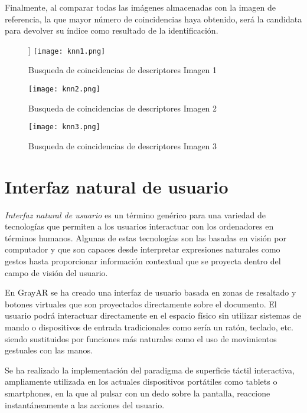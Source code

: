 Finalmente, al comparar todas las imágenes almacenadas con la imagen
de referencia, la que mayor número de coincidencias haya obtenido, será
la candidata para devolver su índice como resultado de la identificación.

  \begin{figure}] 
    \centering
    \texttt{[image: knn1.png]}
    \caption{Busqueda de coincidencias de descriptores Imagen 1}
    \label{fig:knn1}
  \end{figure}



  \begin{figure} 
    \centering
    \texttt{[image: knn2.png]}
    \caption{Busqueda de coincidencias de descriptores Imagen 2}
    \label{fig:knn2}
  \end{figure}



  \begin{figure} 
    \centering
    \texttt{[image: knn3.png]}
    \caption{Busqueda de coincidencias de descriptores Imagen 3}
    \label{fig:knn3}
  \end{figure}



\section{Interfaz natural de usuario}

\emph{Interfaz natural de usuario} es un término genérico para una variedad de tecnologías que
permiten a los usuarios interactuar con los ordenadores en términos humanos. Algunas de
estas tecnologías son las basadas en visión por computador y que son
capaces desde interpretar expresiones naturales como gestos hasta proporcionar información contextual que se
proyecta dentro del campo de visión del usuario.

En GrayAR se ha creado una interfaz de usuario basada en zonas de
resaltado y botones virtuales que son proyectados directamente sobre
el documento. El usuario podrá interactuar directamente en el espacio físico sin utilizar sistemas de mando o dispositivos de entrada tradicionales como sería un ratón,
teclado, etc. siendo sustituidos por funciones más naturales como el
uso de movimientos gestuales con las manos.

Se ha realizado la implementación del paradigma de superficie táctil interactiva,
ampliamente utilizada en los actuales dispositivos portátiles como
tablets o smartphones, en la que al pulsar con un dedo sobre la
pantalla, reaccione instantáneamente a las acciones del usuario.

